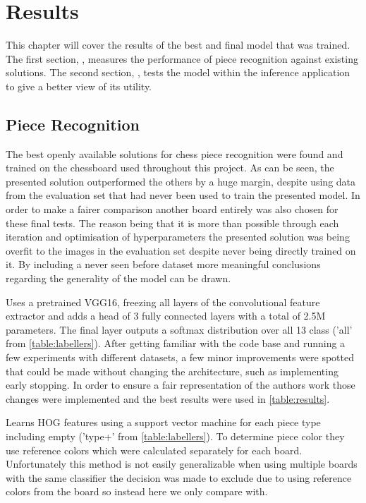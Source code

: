 \chapter{Results}
\label{results}

This chapter will cover the results of the best and final model that was trained.  The first section, , measures the performance
of piece recognition against existing solutions.  The second section, , tests the model within the inference application
to give a better view of its utility.

\section{Piece Recognition}
\label{evaluation}

The best openly available solutions for chess piece recognition were found and trained on the chessboard used throughout this project.
As can be seen, the presented solution outperformed the others by a huge margin, despite using data from the evaluation set that had never
been used to train the presented model.  In order to make a fairer comparison another board entirely was also chosen for these final tests.  The 
reason being that it is more than possible through each iteration and optimisation of hyperparameters the presented solution was being overfit to the 
images in the evaluation set despite never being directly trained on it.  By including a never seen before dataset more meaningful conclusions
regarding the generality of the model can be drawn.

\cite{} Uses a pretrained VGG16, freezing all layers of the convolutional feature extractor and adds a head of 3 fully connected layers with a total of 2.5M parameters.
The final layer outputs a softmax distribution over all 13 class ('all' from \autoref{table:labellers}).  After getting familiar with the code base and running a few 
experiments with different datasets, a few minor improvements were spotted that could be made without changing the architecture, such as implementing early stopping. 
In order to ensure a fair representation of the authors work those changes were implemented and the best results were used in \autoref{table:results}.

\cite{} Learns HOG features using a support vector machine for each piece type including empty ('type+' from \autoref{table:labellers}).  To determine piece color they 
use reference colors which were calculated separately for each board.  Unfortunately this method is not easily generalizable when using multiple boards with the same
classifier the decision was made to exclude due to using reference colors from the board so instead here we only compare with.

